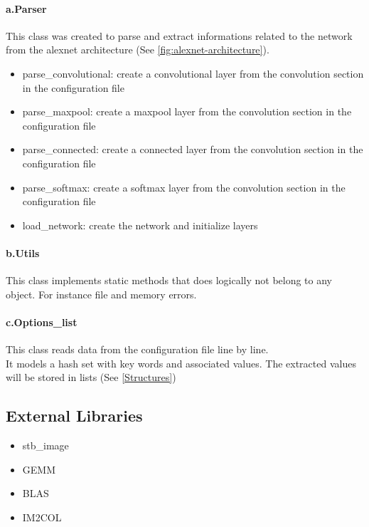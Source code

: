 \documentclass[parskip=full]{scrartcl}
\newcommand\tab[1][1cm]{\hspace*{#1}}
\begin{document}
		\paragraph{a.Parser} \label{Parser}
		\tab This class was created to parse and extract informations related to the network from the alexnet architecture (See \ref{fig:alexnet-architecture}).
		\begin{itemize}
			\item parse\_convolutional: create a convolutional layer from the convolution section in the configuration file
			\item parse\_maxpool: create a maxpool layer from the convolution section in the configuration file
			\item parse\_connected: create a connected layer from the convolution section in the configuration file
			\item parse\_softmax: create a softmax layer from the convolution section in the configuration file
			\item load\_network: create the network and initialize layers
		\end{itemize}
		
		\paragraph{b.Utils}
		\tab This class implements static methods that does logically not belong to any object. For instance file and memory errors. 
		
		\paragraph{c.Options\_list}
		\tab This class reads data from the configuration file line by line.\\
		It models a hash set with key words and associated values. The extracted values will be stored in lists (See \ref{Structures})
		
	\subsection {External Libraries} \label{External Libraries}
		\begin{itemize}
			\item stb\_image
			\item GEMM
			\item BLAS
			\item IM2COL
		\end{itemize}
		
\end{document}
